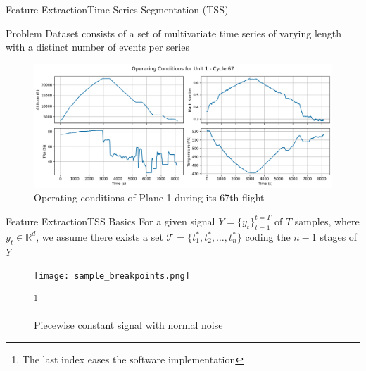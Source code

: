 \documentclass{beamer}
\begin{document}
            \begin{frame}{Feature Extraction}{Time Series Segmentation (TSS)}

                \begin{alertblock}{Problem}
                    Dataset consists of a set of multivariate time series of varying length with a distinct number of events per series
                \end{alertblock}
                \begin{figure}[!htbp]
                    \centering
                    \includegraphics[scale=0.3]{operating_conditions_unit_1_cycle_67.png}
                    \caption{Operating conditions of Plane 1 during its 67th flight}
                \end{figure}

            \end{frame}

            \begin{frame}{Feature Extraction}{TSS Basics}
                For a given signal $Y = \{y_t\}_{t=1}^{t=T}$ of $T$ samples, where $y_t \in \mathbb{R}^d$, we assume there exists a set $\mathcal{T} = \{t_{1}^{*}, t_{2}^{*}, \dots, t_{n}^{*}\}$ coding the $n-1$ stages of $Y$

                \begin{figure}[!htbp]
                    \centering
                    \texttt{[image: sample\_breakpoints.png]}
                    \caption{Piecewise constant signal with normal noise}
                    \footnote{The last index eases the software implementation}
                \end{figure}
            \end{frame}
\end{document}

